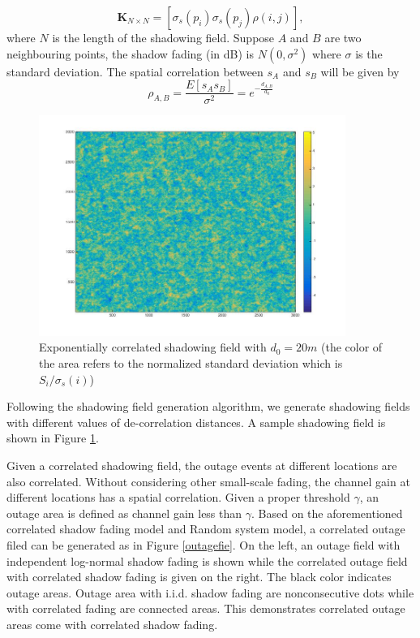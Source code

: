 \begin{equation}
\mathbf{K}_{N\times N} = [ \sigma_{s}(p_{i})\sigma_{s}(p_{j})\rho(i,j)],
\label{correlationmatrix}
\end{equation}
where $N$ is the length of the shadowing field. Suppose $A$ and $B$ are two neighbouring points, the shadow fading (in dB) is $N(0,\sigma^2)$ where $\sigma$ is the standard deviation. The spatial correlation between $s_{A}$ and $s_{B}$ will be given by 
\begin{equation}
\rho_{A,B} = \frac{E[s_{A}s_{B}]}{\sigma^2} =e^{-\frac{d_{A,B}}{d_{0}}}
\end{equation}
\begin{figure}
\centering
\includegraphics[width = 10cm]{ShadowFieldDeCorr20.jpg}
\caption{Exponentially correlated shadowing field with $d_{0} = 20m$ (the color of the area refers to the normalized standard deviation which is $S_{i}/\sigma_{s}(i)$)}

\label{ch4:shadowingfield}
\end{figure}

Following the shadowing field generation algorithm, we generate shadowing fields with different values of de-correlation distances. A sample shadowing field is shown in Figure \ref{ch4:shadowingfield}.

\par Given a correlated shadowing field, the outage events at different locations are also correlated. Without considering other small-scale fading, the channel gain at different locations has a spatial correlation. Given a proper threshold $\gamma$, an outage area is defined as channel gain less than $\gamma$. Based on the aforementioned correlated shadow fading model and Random system model, a correlated outage filed can be generated as in Figure \ref{outagefie}. On the left, an outage field with independent log-normal shadow fading is shown while the correlated outage field with correlated shadow fading is given on the right. The black color indicates outage areas. Outage area with i.i.d. shadow fading are nonconsecutive dots while with correlated fading are connected areas. This demonstrates correlated outage areas come with correlated shadow fading.

